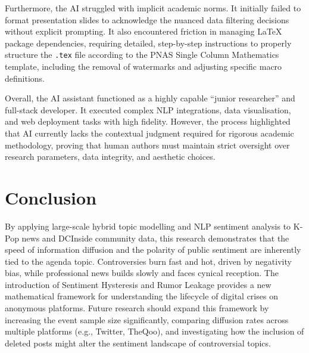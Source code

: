 \documentclass[9pt,twoside,lineno]{pnas-new}
\begin{document}
\begin{article}
Furthermore, the AI struggled with implicit academic norms. It initially failed to format presentation slides to acknowledge the nuanced data filtering decisions without explicit prompting. It also encountered friction in managing LaTeX package dependencies, requiring detailed, step-by-step instructions to properly structure the \texttt{.tex} file according to the PNAS Single Column Mathematics template, including the removal of watermarks and adjusting specific macro definitions.

Overall, the AI assistant functioned as a highly capable ``junior researcher'' and full-stack developer. It executed complex NLP integrations, data visualisation, and web deployment tasks with high fidelity. However, the process highlighted that AI currently lacks the contextual judgment required for rigorous academic methodology, proving that human authors must maintain strict oversight over research parameters, data integrity, and aesthetic choices.

\section*{Conclusion}
By applying large-scale hybrid topic modelling and NLP sentiment analysis to K-Pop news and DCInside community data, this research demonstrates that the speed of information diffusion and the polarity of public sentiment are inherently tied to the agenda topic. Controversies burn fast and hot, driven by negativity bias, while professional news builds slowly and faces cynical reception. The introduction of Sentiment Hysteresis and Rumor Leakage provides a new mathematical framework for understanding the lifecycle of digital crises on anonymous platforms. Future research should expand this framework by increasing the event sample size significantly, comparing diffusion rates across multiple platforms (e.g., Twitter, TheQoo), and investigating how the inclusion of deleted posts might alter the sentiment landscape of controversial topics. 


\showmatmethods{} %




\end{article}
\end{document}
